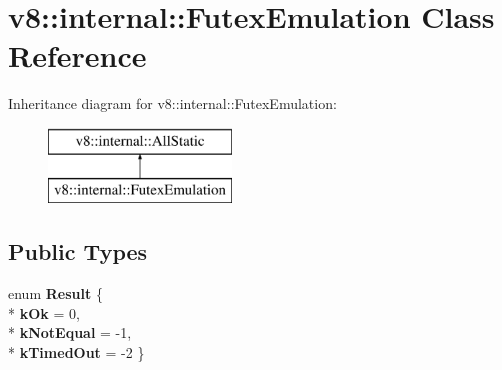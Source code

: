 \hypertarget{classv8_1_1internal_1_1_futex_emulation}{}\section{v8\+:\+:internal\+:\+:Futex\+Emulation Class Reference}
\label{classv8_1_1internal_1_1_futex_emulation}
Inheritance diagram for v8\+:\+:internal\+:\+:Futex\+Emulation\+:\begin{figure}[H]
\begin{center}
\leavevmode
\includegraphics[height=2.000000cm]{classv8_1_1internal_1_1_futex_emulation}
\end{center}
\end{figure}
\subsection*{Public Types}
\begin{DoxyCompactItemize}
\item 
enum {\bfseries Result} \{ \\*
{\bfseries k\+Ok} = 0, 
\\*
{\bfseries k\+Not\+Equal} = -\/1, 
\\*
{\bfseries k\+Timed\+Out} = -\/2
 \}\hypertarget{classv8_1_1internal_1_1_futex_emulation_af47a9c014e3dd6347620c67900010206}{}\label{classv8_1_1internal_1_1_futex_emulation_af47a9c014e3dd6347620c67900010206}

\end{DoxyCompactItemize}
